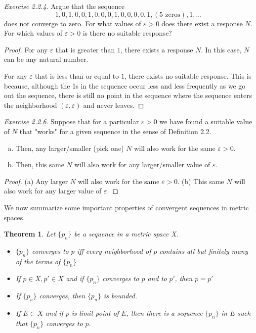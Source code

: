 \documentclass{tufte-book}
\newtheorem{theorem}{Theorem}[chapter]
\theoremstyle{definition}
\numberwithin{section}{chapter}
\begin{document}
\noindent
\emph{Exercise 2.2.4.} Argue that the sequence $$1,0,1,0,0,1,0,0,0,1,0,0,0,0,1,(\text{5 zeros}),1,...$$
does not converge to zero. For what values of $\varepsilon > 0$ does there exist a response $N$. For which values of $\varepsilon > 0$ is there no suitable response?

\begin{proof}
For any $\varepsilon$ that is greater than $1$, there exists a response $N$. In this case, $N$ can be any natural number.

For any $\varepsilon$ that is less than or equal to $1$, there exists no suitable response. This is because, although the 1s in the sequence occur less and less frequently as we go out the sequence, there is still no point in the sequence where the sequence enters the neighborhood $(\varepsilon, \varepsilon)$ and never leaves.

\end{proof}


\emph{Exercise 2.2.6.} Suppose that for a particular $\varepsilon > 0$ we have found a suitable value of $N$ that "works" for a given sequence in the sense of Definition 2.2.
\begin{enumerate}[(a)]	
\item Then, any larger/smaller (pick one) $N$ will also work for the same $\varepsilon > 0$. 
\item Then, this same $N$ will also work for any larger/smaller value of $\varepsilon$.
\end{enumerate}

\begin{proof}
(a) Any larger $N$ will also work for the same $\varepsilon > 0$. (b) This same $N$ will also work for any larger value of $\varepsilon$.
\end{proof}

We now summarize some important properties of convergent sequences in metric spaces.

\begin{theorem}  Let $\{p_n\}$ be a sequence in a metric space X.
\begin{itemize}
	\item $\{p_n\}$  converges to $p$ iff every neighborhood of $p$ contains all but finitely many of the terms of $\{p_n\}$
	\item If $p \in X, p' \in X$ and if $\{p_n\}$ converges to $p$ and to $p'$, then $ p=p'$
	\item If $\{p_n\}$ converges, then $\{p_n\}$ is bounded.
	\item If $E \subset X$ and if $p$ is limit point of $E$, then there is a sequence $\{p_n\}$ in $E$ such that $\{p_n\}$ converges to $p$.
\end{itemize}
\end{theorem}
\end{document}
